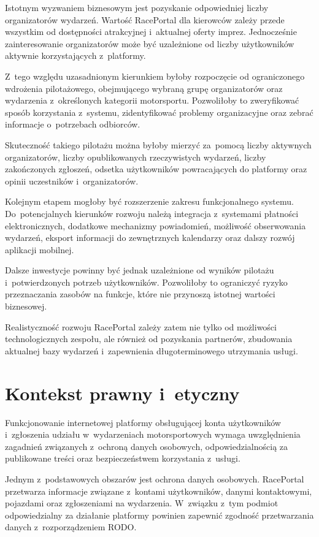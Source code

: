\documentclass{sprz}
\begin{document}
Istotnym wyzwaniem biznesowym jest pozyskanie odpowiedniej liczby organizatorów wydarzeń. Wartość RacePortal dla kierowców zależy przede wszystkim od dostępności atrakcyjnej i~aktualnej oferty imprez. Jednocześnie zainteresowanie organizatorów może być uzależnione od liczby użytkowników aktywnie korzystających z~platformy.

Z~tego względu uzasadnionym kierunkiem byłoby rozpoczęcie od ograniczonego wdrożenia pilotażowego, obejmującego wybraną grupę organizatorów oraz wydarzenia z~określonych kategorii motorsportu. Pozwoliłoby to zweryfikować sposób korzystania z~systemu, zidentyfikować problemy organizacyjne oraz zebrać informacje o~potrzebach odbiorców.

Skuteczność takiego pilotażu można byłoby mierzyć za~pomocą liczby aktywnych organizatorów, liczby opublikowanych rzeczywistych wydarzeń, liczby zakończonych zgłoszeń, odsetka użytkowników powracających do platformy oraz opinii uczestników i~organizatorów.

Kolejnym etapem mogłoby być rozszerzenie zakresu funkcjonalnego systemu. Do~potencjalnych kierunków rozwoju należą integracja z~systemami płatności elektronicznych, dodatkowe mechanizmy powiadomień, możliwość obserwowania wydarzeń, eksport informacji do zewnętrznych kalendarzy oraz dalszy rozwój aplikacji mobilnej.

Dalsze inwestycje powinny być jednak uzależnione od wyników pilotażu i~potwierdzonych potrzeb użytkowników. Pozwoliłoby to ograniczyć ryzyko przeznaczania zasobów na funkcje, które nie przynoszą istotnej wartości biznesowej.

Realistyczność rozwoju RacePortal zależy zatem nie tylko od możliwości technologicznych zespołu, ale również od pozyskania partnerów, zbudowania aktualnej bazy wydarzeń i~zapewnienia długoterminowego utrzymania usługi.

\section{Kontekst prawny i~etyczny}
Funkcjonowanie internetowej platformy obsługującej konta użytkowników i~zgłoszenia udziału w~wydarzeniach motorsportowych wymaga uwzględnienia zagadnień związanych z~ochroną danych osobowych, odpowiedzialnością za publikowane treści oraz bezpieczeństwem korzystania z~usługi.

Jednym z~podstawowych obszarów jest ochrona danych osobowych. RacePortal przetwarza informacje związane z~kontami użytkowników, danymi kontaktowymi, pojazdami oraz zgłoszeniami na wydarzenia. W~związku z~tym podmiot odpowiedzialny za działanie platformy powinien zapewnić zgodność przetwarzania danych z~rozporządzeniem RODO.
\end{document}
